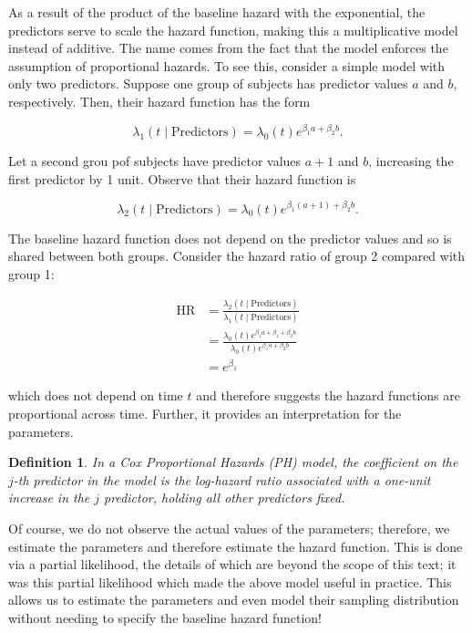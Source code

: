 \documentclass[
]{book}
\theoremstyle{plain}
\theoremstyle{mydefn}
\newtheorem{definition}{Definition}[chapter]
\theoremstyle{myexmpl}
\theoremstyle{remark}
\begin{document}
As a result of the product of the baseline hazard with the exponential, the predictors serve to scale the hazard function, making this a multiplicative model instead of additive. The name comes from the fact that the model enforces the assumption of proportional hazards. To see this, consider a simple model with only two predictors. Suppose one group of subjects has predictor values \(a\) and \(b\), respectively. Then, their hazard function has the form

\[\lambda_1(t \mid \text{Predictors}) = \lambda_0(t) e^{\beta_1 a + \beta_2 b}.\]

Let a second grou pof subjects have predictor values \(a + 1\) and \(b\), increasing the first predictor by 1 unit. Observe that their hazard function is

\[\lambda_2(t \mid \text{Predictors}) = \lambda_0(t) e^{\beta_1 (a + 1) + \beta_2 b}.\]

The baseline hazard function does not depend on the predictor values and so is shared between both groups. Consider the hazard ratio of group 2 compared with group 1:

\[
\begin{aligned}
  \text{HR} &= \frac{\lambda_2(t \mid \text{Predictors})}{\lambda_1(t \mid \text{Predictors})} \\
    &= \frac{\lambda_0(t) e^{\beta_1 a + \beta_1 + \beta_2 b}}{\lambda_0(t) e^{\beta_1 a + \beta_2 b}} \\
    &= e^{\beta_1}
\end{aligned}
\]

which does not depend on time \(t\) and therefore suggests the hazard functions are proportional across time. Further, it provides an interpretation for the parameters.

\begin{definition}
In a Cox Proportional Hazards (PH) model, the coefficient on the \(j\)-th predictor in the model is the log-hazard ratio associated with a one-unit increase in the \(j\) predictor, holding all other predictors fixed.
\end{definition}

Of course, we do not observe the actual values of the parameters; therefore, we estimate the parameters and therefore estimate the hazard function. This is done via a partial likelihood, the details of which are beyond the scope of this text; it was this partial likelihood which made the above model useful in practice. This allows us to estimate the parameters and even model their sampling distribution without needing to specify the baseline hazard function!
\end{document}
